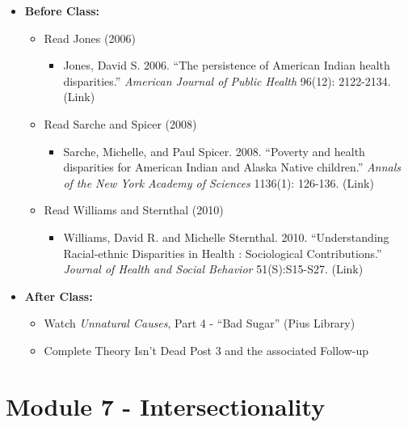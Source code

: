 \documentclass[
]{book}
\providecommand{\tightlist}{%
  \setlength{\itemsep}{0pt}\setlength{\parskip}{0pt}}
\begin{document}
\begin{itemize}
\tightlist
\item
  \textbf{Before Class:}

  \begin{itemize}
  \tightlist
  \item
    Read Jones (2006)

    \begin{itemize}
    \tightlist
    \item
      Jones, David S. 2006. ``The persistence of American Indian health disparities.'' \emph{American Journal of Public Health} 96(12): 2122-2134. (Link)
    \end{itemize}
  \item
    Read Sarche and Spicer (2008)

    \begin{itemize}
    \tightlist
    \item
      Sarche, Michelle, and Paul Spicer. 2008. ``Poverty and health disparities for American Indian and Alaska Native children.'' \emph{Annals of the New York Academy of Sciences} 1136(1): 126-136. (Link)
    \end{itemize}
  \item
    Read Williams and Sternthal (2010)

    \begin{itemize}
    \tightlist
    \item
      Williams, David R. and Michelle Sternthal. 2010. ``Understanding Racial-ethnic Disparities in Health : Sociological Contributions.'' \emph{Journal of Health and Social Behavior} 51(S):S15-S27. (Link)
    \end{itemize}
  \end{itemize}
\item
  \textbf{After Class:}

  \begin{itemize}
  \tightlist
  \item
    Watch \emph{Unnatural Causes}, Part 4 - ``Bad Sugar'' (Pius Library)
  \item
    Complete Theory Isn't Dead Post 3 and the associated Follow-up
  \end{itemize}
\end{itemize}

\newpage

\hypertarget{module-7---intersectionality}{%
\section{Module 7 - Intersectionality}\label{module-7---intersectionality}}
\end{document}
